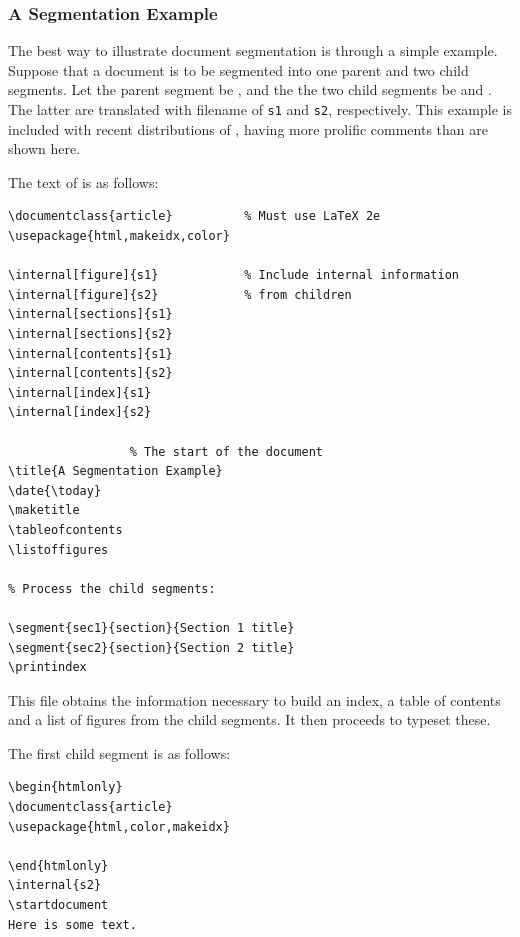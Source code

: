 \subsubsection{A Segmentation Example%
  \label{sec:segmentexample}}%
\begin{changebar}%
\noindent
The best way to illustrate document segmentation 
is through a simple example.  
Suppose that a document is to be segmented into one parent 
and two child segments.  
Let the parent segment be , 
and the the two child segments be  and .  
The latter are translated with filename  of 
\texttt{s1} and \texttt{s2}, respectively.  
This example is included with recent distributions of \latextohtml, 
having more prolific comments than are shown here.

\medskip\htmlrule[width=300]
\html{\\}\noindent
The text of  is as follows:
\begin{small}
\begin{verbatim}
\documentclass{article}          % Must use LaTeX 2e
\usepackage{html,makeidx,color}

\internal[figure]{s1}            % Include internal information
\internal[figure]{s2}            % from children
\internal[sections]{s1}
\internal[sections]{s2}
\internal[contents]{s1}
\internal[contents]{s2}
\internal[index]{s1}
\internal[index]{s2}

                 % The start of the document
\title{A Segmentation Example}
\date{\today}
\maketitle
\tableofcontents
\listoffigures

% Process the child segments:

\segment{sec1}{section}{Section 1 title}
\segment{sec2}{section}{Section 2 title}
\printindex

\end{verbatim}
\end{small}
This file obtains the information necessary to build an
index, a table of contents and a list of figures from the
child segments.  It then proceeds to typeset these.

\medskip\htmlrule[width=300]
\html{\\}\noindent
The first child segment  is as follows:
\begin{small}
\begin{verbatim}
\begin{htmlonly}
\documentclass{article}
\usepackage{html,color,makeidx}

\end{htmlonly}
\internal{s2}
\startdocument
Here is some text.

\end{verbatim}
\end{small}
\end{changebar}
